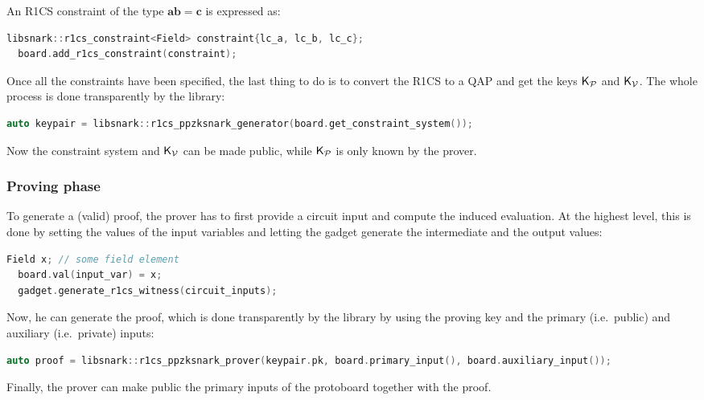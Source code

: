 An R1CS constraint of the type \(\bm{ab} = \bm{c}\) is expressed as:
\begin{lstlisting}[language=C++]
  libsnark::r1cs_constraint<Field> constraint{lc_a, lc_b, lc_c};
  board.add_r1cs_constraint(constraint);
\end{lstlisting}
Once all the constraints have been specified, the last thing to do is to convert the R1CS to a 
QAP and get the keys \(\mathsf{K}_\mathcal{P} \) and \(\mathsf{K}_\mathcal{V} \).
The whole process is done transparently by the library:
\begin{lstlisting}[language=C++]
  auto keypair = libsnark::r1cs_ppzksnark_generator(board.get_constraint_system());
\end{lstlisting}
Now the constraint system and \(\mathsf{K}_\mathcal{V} \) can be made public, while \(\mathsf{K}_\mathcal{P} \) is only 
known by the prover. 

\subsubsection*{Proving phase}
To generate a (valid) proof, the prover has to first provide a circuit input and compute the 
induced evaluation. 
At the highest level, this is done by setting the values of the input variables and letting the 
gadget generate the intermediate and the output values:
\begin{lstlisting}[language=C++]
  Field x; // some field element
  board.val(input_var) = x;
  gadget.generate_r1cs_witness(circuit_inputs);
\end{lstlisting}
Now, he can generate the proof, which is done transparently by the library by using the 
proving key and the primary (i.e.\ public) and auxiliary (i.e.\ private) inputs:
\begin{lstlisting}[language=C++]
  auto proof = libsnark::r1cs_ppzksnark_prover(keypair.pk, board.primary_input(), board.auxiliary_input());
\end{lstlisting}
Finally, the prover can make public the primary inputs of the protoboard together with the
proof.

